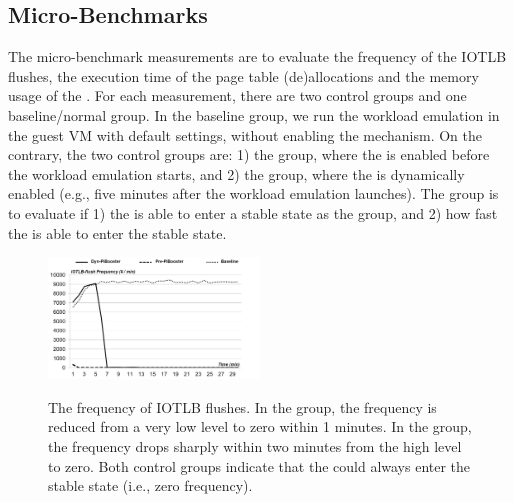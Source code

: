 
\subsection{Micro-Benchmarks}
The micro-benchmark measurements are to evaluate the frequency of the IOTLB flushes, the execution time of the page table (de)allocations and the memory usage of the \cache.
For each measurement, there are two control groups and one baseline/normal group.
In the baseline group, we run the workload emulation in the guest VM with default settings, without enabling the \name mechanism.
On the contrary, the two control groups are: 1) the \prename group, where the \name is enabled before the workload emulation starts, and 2) the \dynname group, where the \name is dynamically enabled (e.g., five minutes after the workload emulation launches). The \dynname group is to evaluate if 1) the \name is able to enter a stable state as the \prename group, and 2) how fast the \name is able to enter the stable state.

\begin{figure}[ht]
\centering
\includegraphics[width=0.5\textwidth]{image/micro/iotlbflush.jpg} \\
\caption{The frequency of IOTLB flushes.  In the \prename group, the frequency is reduced from a very low level to zero within 1 minutes. In the \dynname group, the frequency drops sharply within two minutes from the high level to zero. Both control groups indicate that the \name could always enter the stable state (i.e., zero frequency).}
\label{fig:iotlbflush}
\end{figure}

